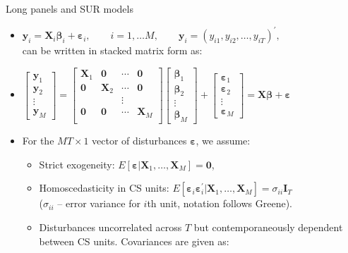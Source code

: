 \documentclass[usenames,dvipsnames]{beamer}
\begin{document}
\begin{frame}{Long panels and SUR models}
\footnotesize
\begin{itemize}
    \item $\bm{y}_i = \bm{X}_i \bm{\beta}_i + \bm{\varepsilon}_i,\qquad i = 1,\dots M,\qquad \bm{y}_i = (y_{i1},y_{i2},\dots,y_{iT})^{\prime}, $\\ \smallskip 
    can be written in stacked matrix form as:
    \medskip
    \item $\begin{bmatrix}
    \bm{y}_1 \\ \bm{y}_2 \\ \vdots \\ \bm{y}_M
    \end{bmatrix} = 
    \begin{bmatrix} 
    \bm{X}_1 & \bm{0} & \cdots & \bm{0} \\ 
    \bm{0} & \bm{X}_2 & \cdots & \bm{0} \\ 
      &   & \vdots &  \\ 
    \bm{0} & \bm{0} & \cdots & \bm{X}_M \\ 
    \end{bmatrix}
    \begin{bmatrix}
    \bm{\beta}_1 \\ \bm{\beta}_2 \\ \vdots \\ \bm{\beta}_M
    \end{bmatrix} + 
    \begin{bmatrix}
    \bm{\varepsilon}_1 \\ \bm{\varepsilon}_2 \\ \vdots \\ \bm{\varepsilon}_M
    \end{bmatrix} = \bm{X\beta}+\bm{\varepsilon}$
    \medskip
    \item For the $MT \times 1$ vector of disturbances $\bm{\varepsilon}$, we assume:
    \begin{itemize}
        \item Strict exogeneity: $E[\bm{\varepsilon}|\bm{X}_1,\dots,\bm{X}_M]=\bm{0}$,
        \item Homoscedasticity in CS units: $E[\bm{\varepsilon}_i \bm{\varepsilon}_i^{\prime} |\bm{X}_1,\dots,\bm{X}_M]=\sigma_{ii}\bm{I}_T$\\ ($\sigma_{ii}$ -- error variance for $i$th unit, notation follows Greene).
        \item Disturbances uncorrelated across $T$ but contemporaneously dependent between CS units. Covariances are given as:\\

\end{itemize}
\end{itemize}
\end{frame}
\end{document}
